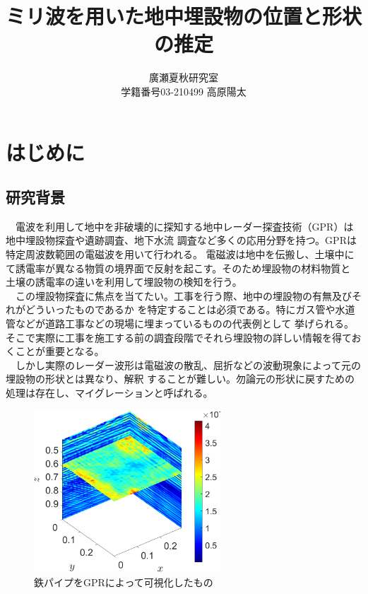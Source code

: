 \documentclass[a4paper,12pt]{jsreport}
\title{ミリ波を用いた地中埋設物の位置と形状の推定}
\author{廣瀬夏秋研究室\\
学籍番号03-210499 高原陽太}
\begin{document}
\maketitle
\tableofcontents

\chapter{はじめに}
\section{研究背景}
　電波を利用して地中を非破壊的に探知する地中レーダー探査技術（GPR）は地中埋設物探査や遺跡調査、地下水流
調査など多くの応用分野を持つ\cite{radar1}\cite{radar2}。GPRは特定周波数範囲の電磁波を用いて行われる。
電磁波は地中を伝搬し、土壌中にて誘電率が異なる物質の境界面で反射を起こす。そのため埋設物の材料物質と
土壌の誘電率の違いを利用して埋設物の検知を行う。
\\　この埋設物探査に焦点を当てたい。工事を行う際、地中の埋設物の有無及びそれがどういったものであるか
を特定することは必須である。特にガス管や水道管などが道路工事などの現場に埋まっているものの代表例として
挙げられる。そこで実際に工事を施工する前の調査段階でそれら埋設物の詳しい情報を得ておくことが重要となる。
\\　しかし実際のレーダー波形は電磁波の散乱、屈折などの波動現象によって元の埋設物の形状とは異なり、解釈
することが難しい。勿論元の形状に戻すための処理は存在し、マイグレーションと呼ばれる。


\begin{figure}[h]
  \begin{center}
   \includegraphics[width=7cm]{./image/0918.png}
   
  \caption{鉄パイプをGPRによって可視化したもの}\label{鉄パイプをGPRによって可視化したもの}
  \end{center}
  \end{figure}
\end{document}

